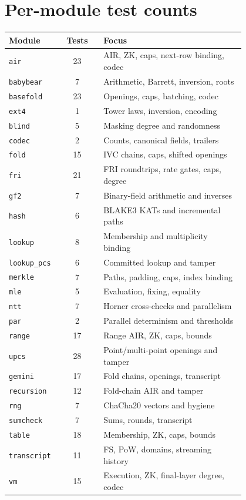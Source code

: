 \documentclass[11pt,a4paper]{article}
\begin{document}
\section{Per-module test counts}

\begin{longtable}{@{}L{0.20\linewidth}cL{0.60\linewidth}@{}}
\toprule
Module & Tests & Focus \\
\midrule
\endhead
\texttt{air} & 23 & AIR, ZK, caps, next-row binding, codec \\
\texttt{babybear} & 7 & Arithmetic, Barrett, inversion, roots \\
\texttt{basefold} & 23 & Openings, caps, batching, codec \\
\texttt{ext4} & 1 & Tower laws, inversion, encoding \\
\texttt{blind} & 5 & Masking degree and randomness \\
\texttt{codec} & 2 & Counts, canonical fields, trailers \\
\texttt{fold} & 15 & IVC chains, caps, shifted openings \\
\texttt{fri} & 21 & FRI roundtrips, rate gates, caps, degree \\
\texttt{gf2} & 7 & Binary-field arithmetic and inverses \\
\texttt{hash} & 6 & BLAKE3 KATs and incremental paths \\
\texttt{lookup} & 8 & Membership and multiplicity binding \\
\texttt{lookup\_pcs} & 6 & Committed lookup and tamper \\
\texttt{merkle} & 7 & Paths, padding, caps, index binding \\
\texttt{mle} & 5 & Evaluation, fixing, equality \\
\texttt{ntt} & 7 & Horner cross-checks and parallelism \\
\texttt{par} & 2 & Parallel determinism and thresholds \\
\texttt{range} & 17 & Range AIR, ZK, caps, bounds \\
\texttt{upcs} & 28 & Point/multi-point openings and tamper \\
\texttt{gemini} & 17 & Fold chains, openings, transcript \\
\texttt{recursion} & 12 & Fold-chain AIR and tamper \\
\texttt{rng} & 7 & ChaCha20 vectors and hygiene \\
\texttt{sumcheck} & 7 & Sums, rounds, transcript \\
\texttt{table} & 18 & Membership, ZK, caps, bounds \\
\texttt{transcript} & 11 & FS, PoW, domains, streaming history \\
\texttt{vm} & 15 & Execution, ZK, final-layer degree, codec \\
\bottomrule
\end{longtable}
\end{document}
